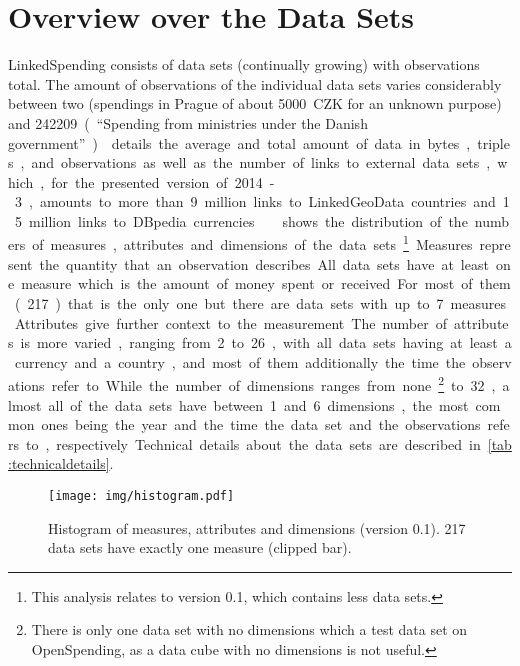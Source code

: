 \documentclass[sw]{iosart2x}
\begin{document}
\section{Overview over the Data Sets}\label{sec:overview}
LinkedSpending consists of \numberofdatasets{} data sets (continually growing) with \numberofobservationsapproximate{} observations total.
The amount of observations of the individual data sets varies considerably between two (spendings in Prague of about \SI{5000}{CZK} for an unknown purpose) and \SI{242209} (\enquote{Spending from ministries under the Danish government}).
 details the average and total amount of data in bytes, triples, and observations as well as the number of links to external data sets, which, for the presented version of 2014-3, amounts to more than 9 million links to LinkedGeoData countries and 1.5 million links to DBpedia currencies.\footnotemark
{}
 shows the distribution of the numbers of measures, attributes and dimensions of the data sets.\footnote{This analysis relates to version 0.1, which contains less data sets.}
Measures represent the quantity that an observation describes.
All data sets have at least one measure which is the amount of money spent or received.
For most of them (217) that is the only one but there are data sets with up to 7 measures.
Attributes give further context to the measurement.
The number of attributes is more varied, ranging from 2 to 26, with all data sets having at least a currency and a country, and most of them additionally the time the observations refer to.
While the number of dimensions ranges from none\footnote{There is only one data set with no dimensions which a test data set on OpenSpending, as a data cube with no dimensions is not useful.} to 32, almost all of the data sets have between 1 and 6 dimensions, 
the most common ones being the year and the time the data set and the observations refers to, respectively.
Technical details about the data sets are described in \cref{tab:technicaldetails}.

\begin{figure}[h]
\texttt{[image: img/histogram.pdf]}
\caption{Histogram of measures, attributes and dimensions (version 0.1). \num{217} data sets have exactly one measure (clipped bar).}
\label{fig:histogram}
\end{figure}
\end{document}
